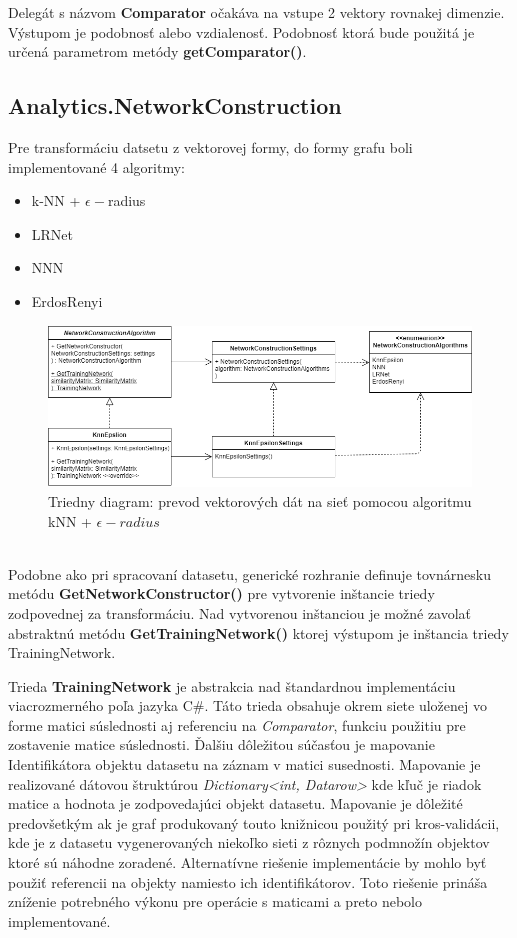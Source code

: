 \documentclass[slovak,master,dept460,male,cpp,cpdeclaration]{diploma}
\begin{document}
Delegát s názvom \textbf{Comparator} očakáva na vstupe 2 vektory rovnakej dimenzie. Výstupom je podobnosť alebo vzdialenosť. Podobnosť ktorá bude použitá je určená parametrom metódy \textbf{getComparator()}.

\subsection{Analytics.NetworkConstruction}
\label{cap:network_construction}
Pre transformáciu datsetu z vektorovej formy, do formy grafu boli implementované 4 algoritmy:
\begin{itemize}
\item k-NN + $\epsilon-$radius
\item LRNet
\item NNN
\item ErdosRenyi
\end{itemize}

\begin{figure}[H]
\includegraphics[width=\textwidth]{construction.png}
\caption{Triedny diagram: prevod vektorových dát na sieť pomocou algoritmu kNN + $\epsilon-radius$}
\end{figure} \\

Podobne ako pri spracovaní datasetu, generické rozhranie definuje tovnárnesku metódu \textbf{GetNetworkConstructor()} pre vytvorenie inštancie triedy zodpovednej za transformáciu. Nad vytvorenou inštanciou je možné zavolať abstraktnú metódu \textbf{GetTrainingNetwork()} ktorej výstupom je inštancia triedy TrainingNetwork.

Trieda \textbf{TrainingNetwork} je abstrakcia nad štandardnou implementáciu viacrozmerného poľa jazyka C\#. Táto trieda obsahuje okrem siete uloženej vo forme matici súslednosti aj referenciu na \textit{Comparator}, funkciu použitiu pre zostavenie matice súslednosti. Ďalšiu dôležitou súčasťou je mapovanie Identifikátora objektu datasetu na záznam v matici susednosti. Mapovanie je realizované dátovou štruktúrou \textit{Dictionary<int, Datarow>} kde kľuč je riadok matice a hodnota je zodpovedajúci objekt datasetu. 
Mapovanie je dôležité predovšetkým ak je graf produkovaný touto knižnicou použitý pri kros-validácii, kde je z datasetu vygenerovaných niekoľko sieti z rôznych podmnožín objektov ktoré sú náhodne zoradené. Alternatívne riešenie implementácie by mohlo byť použiť referencii na objekty namiesto ich identifikátorov. Toto riešenie prináša zníženie potrebného výkonu pre operácie s maticami a preto nebolo implementované.
\end{document}

